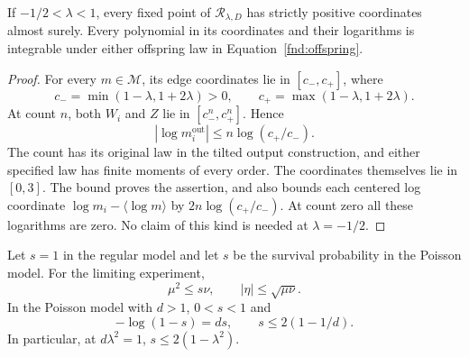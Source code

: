 \begin{lemma}
\label{fnd:log-integrability}
If \(-1/2<\lambda<1\), every fixed point of
\(\mathcal R_{\lambda,D}\) has strictly positive coordinates almost
surely.  Every polynomial in its coordinates and their logarithms is
integrable under either offspring law in Equation~\eqref{fnd:offspring}.
\end{lemma}

\begin{proof}
For every \(m\in\mathcal M\), its edge coordinates lie in
\([c_-,c_+]\), where
\[
 c_- =\min(1-\lambda,1+2\lambda)>0,\qquad
 c_+ =\max(1-\lambda,1+2\lambda).
\]
At count \(n\), both \(W_i\) and \(Z\) lie in
\([c_-^n,c_+^n]\).  Hence
\begin{equation}\label{fnd:log-bound}
 |\log m_i^{\mathrm{out}}|\leq n\log(c_+/c_-).
\end{equation}
The count has its original law in the tilted output construction,
and either specified law has finite moments of every order.  The
coordinates themselves lie in \([0,3]\).  The bound proves the
assertion, and also bounds each centered log coordinate
\(\log m_i-\langle\log m\rangle\) by
\(2n\log(c_+/c_-)\).  At count zero all these logarithms are zero.
No claim of this kind is needed at \(\lambda=-1/2\).
\end{proof}

\begin{lemma}\label{fnd:survival}
Let \(s=1\) in the regular model and let \(s\) be the survival
probability in the Poisson model.  For the limiting experiment,
\begin{equation}\label{fnd:survival-moments}
 \mu^2\leq s\nu,\qquad |\eta|\leq\sqrt{\mu\nu}.
\end{equation}
In the Poisson model with \(d>1\), \(0<s<1\) and
\begin{equation}\label{fnd:survival-equation}
 -\log(1-s)=ds,\qquad
 s\leq2(1-1/d).
\end{equation}
In particular, at \(d\lambda^2=1\),
\(s\leq2(1-\lambda^2)\).
\end{lemma}

